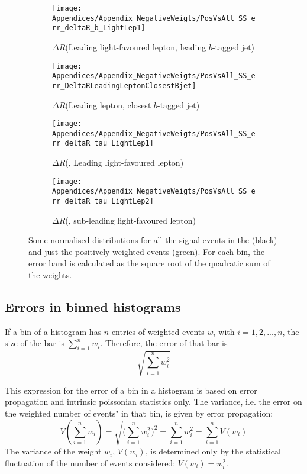 \begin{figure}
\centering
\begin{subfigure}{.44\textwidth}
  \centering
  \texttt{[image: Appendices/Appendix\_NegativeWeigts/PosVsAll\_SS\_err\_deltaR\_b\_LightLep1]}
  \caption{$\Delta R$(Leading light-favoured lepton, leading $b$-tagged jet)}
\end{subfigure}%
\begin{subfigure}{.44\textwidth}
  \centering
  \texttt{[image: Appendices/Appendix\_NegativeWeigts/PosVsAll\_SS\_err\_DeltaRLeadingLeptonClosestBjet]}
  \caption{$\Delta R$(Leading lepton, closest $b$-tagged jet)}
\end{subfigure} \hfill%

\begin{subfigure}{.44\textwidth}
  \centering
  \texttt{[image: Appendices/Appendix\_NegativeWeigts/PosVsAll\_SS\_err\_deltaR\_tau\_LightLep1]}
  \caption{$\Delta R$(\tauhad, Leading light-favoured lepton)}
\end{subfigure}%
\begin{subfigure}{.44\textwidth}
  \centering
  \texttt{[image: Appendices/Appendix\_NegativeWeigts/PosVsAll\_SS\_err\_deltaR\_tau\_LightLep2]}
  \caption{$\Delta R$(\tauhad, sub-leading light-favoured lepton)}
\end{subfigure}%
\caption{Some normalised distributions for all the signal events in the \dilepSStau (black) and just the positively weighted events (green).  For each bin, the error band is calculated as the square root of the quadratic sum of the weights.}
\label{fig:Appendix:NegWeights:Distributions}
\end{figure}


\subsection{Errors in binned histograms}
If a bin of a histogram has $n$ entries of weighted events $w_i$ with $i=1, 2, ..., n$, the 
size of the bar is $\sum_{i=1}^{n} w_i$. Therefore, the error of that bar is 
\begin{equation}
\sqrt{\sum_{i=1}^{n} w^{2}_{i}}
\end{equation}

This expression for the error of a bin in a histogram is based on error propagation and intrinsic poissonian statistics only.
The variance, i.e.  the error on the weighted number of events" in that bin, is given by error propagation:
\begin{equation*}
V(\sum_{i=1}^{n} w_i) = \sqrt{(\sum_{i=1}^{n} w^{2}_{i}})^{2} = \sum_{i=1}^{n} w^{2}_{i} = \sum_{i=1}^{n}  V(w_i)
\end{equation*}
The variance of the weight $w_i$, $V(w_i)$, is determined only by the statistical fluctuation of the number of events 
considered: $V(w_{i}) =w^{2}_{i}$. 


